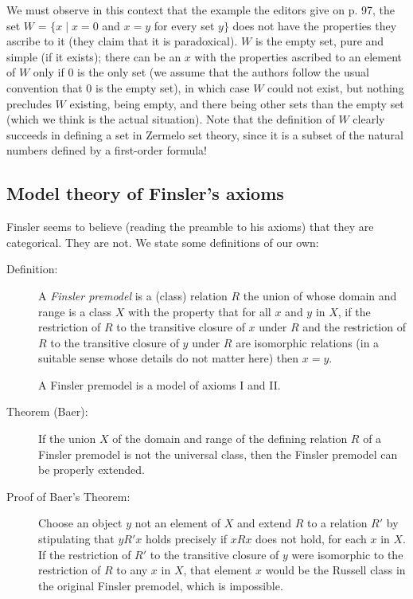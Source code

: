 We must observe in this context that the example the editors give on
p. 97, the set $W$ = $\{x \mid x=0$ and $x=y$ for every set $y\}$ does
not have the properties they ascribe to it (they claim that it is
paradoxical).  $W$ is the empty set, pure and simple (if it exists);
there can be an $x$ with the properties ascribed to an element of $W$
only if 0 is the only set (we assume that the authors follow the usual
convention that 0 is the empty set), in which case $W$ could not
exist, but nothing precludes $W$ existing, being empty, and there
being other sets than the empty set (which we think is the actual
situation).  Note that the definition of $W$ clearly succeeds in
defining a set in Zermelo set theory, since it is a subset of the
natural numbers defined by a first-order formula!

\subsection{Model theory of Finsler's axioms}

Finsler seems to believe (reading the preamble to his axioms) that
they are categorical.  They are not.  We state some definitions of our own:

\begin{description}

\item[Definition:] A {\em Finsler premodel\/} is a (class) relation
$R$ the union of whose domain and range is a class $X$ with the
property that for all $x$ and $y$ in $X$, if the restriction of $R$ to
the transitive closure of $x$ under $R$ and the restriction of $R$ to
the transitive closure of $y$ under $R$ are isomorphic relations (in a
suitable sense whose details do not matter here) then $x=y$.

A Finsler premodel is a model of axioms I and II.

\item[Theorem (Baer):] If the union $X$ of the domain and range of the
defining relation $R$ of a Finsler premodel is not the universal
class, then the Finsler premodel can be properly extended.

\item[Proof of Baer's Theorem:] Choose an object $y$ not an element of
$X$ and extend $R$ to a relation $R'$ by stipulating that $y R' x$
holds precisely if $x R x$ does not hold, for each $x$ in $X$.  If the
restriction of $R'$ to the transitive closure of $y$ were isomorphic
to the restriction of $R$ to any $x$ in $X$, that element $x$ would be
the Russell class in the original Finsler premodel, which is
impossible.

\end{description}

